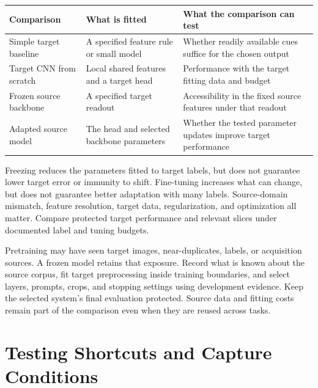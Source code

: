 \par\addvspace{\intextsep}\noindent\begin{minipage}{\linewidth}
\centering\small
\begin{tabular}{@{}L{2.3cm}L{3.4cm}L{4.0cm}@{}}
\toprule
Comparison & What is fitted & What the comparison can test \\
\midrule
Simple target baseline & A specified feature rule or small model & Whether readily available cues suffice for the chosen output \\
Target CNN from scratch & Local shared features and a target head & Performance with the target fitting data and budget \\
Frozen source backbone & A specified target readout & Accessibility in the fixed source features under that readout \\
Adapted source model & The head and selected backbone parameters & Whether the tested parameter updates improve target performance \\
\bottomrule
\end{tabular}
\label{tab:vision-baseline-ladder}
\end{minipage}\par\addvspace{\intextsep}

Freezing reduces the parameters fitted to target labels, but does not guarantee lower target error or immunity to shift. Fine-tuning increases what can change, but does not guarantee better adaptation with many labels. Source-domain mismatch, feature resolution, target data, regularization, and optimization all matter. Compare protected target performance and relevant slices under documented label and tuning budgets.

Pretraining may have seen target images, near-duplicates, labels, or acquisition sources. A frozen model retains that exposure. Record what is known about the source corpus, fit target preprocessing inside training boundaries, and select layers, prompts, crops, and stopping settings using development evidence. Keep the selected system's final evaluation protected. Source data and fitting costs remain part of the comparison even when they are reused across tasks.

\section{Testing Shortcuts and Capture Conditions}


